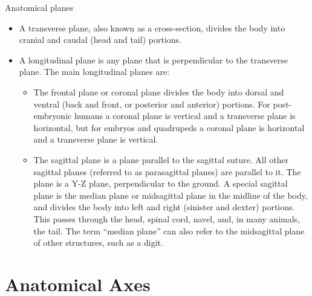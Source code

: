 Anatomical planes

\begin{itemize}
\tightlist
\item
  A transverse plane, also known as a cross-section, divides the body into cranial and caudal (head and tail) portions.
\item
  A longitudinal plane is any plane that is perpendicular to the transverse plane. The main longitudinal planes are:

  \begin{itemize}
  \tightlist
  \item
    The frontal plane or coronal plane divides the body into dorsal and ventral (back and front, or posterior and anterior) portions. For post-embryonic humans a coronal plane is vertical and a transverse plane is horizontal, but for embryos and quadrupeds a coronal plane is horizontal and a transverse plane is vertical.
  \item
    The sagittal plane is a plane parallel to the sagittal suture. All other sagittal planes (referred to as parasagittal planes) are parallel to it. The plane is a Y-Z plane, perpendicular to the ground. A special sagittal plane is the median plane or midsagittal plane in the midline of the body, and divides the body into left and right (sinister and dexter) portions. This passes through the head, spinal cord, navel, and, in many animals, the tail. The term ``median plane'' can also refer to the midsagittal plane of other structures, such as a digit.
  \end{itemize}
\end{itemize}

\hypertarget{anatomical-axes}{%
\section{Anatomical Axes}\label{anatomical-axes}}

